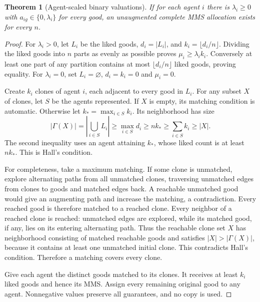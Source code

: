 \documentclass[11pt,a4paper]{article}
\newtheorem{theorem}{Theorem}[section]
\theoremstyle{remark}\newtheorem{remark}[theorem]{Remark}
\begin{document}
\begin{theorem}[Agent-scaled binary valuations]\label{thm:binaryMMS}
If for each agent $i$ there is $\lambda_i\ge0$ with $a_{ig}\in\{0,\lambda_i\}$ for every good, an unaugmented complete MMS allocation exists for every $n$.
\end{theorem}
\begin{proof}
For $\lambda_i>0$, let $L_i$ be the liked goods, $d_i=|L_i|$, and $k_i=\lfloor d_i/n\rfloor$. Dividing the liked goods into $n$ parts as evenly as possible proves $\mu_i\ge\lambda_i k_i$. Conversely at least one part of any partition contains at most $\lfloor d_i/n\rfloor$ liked goods, proving equality. For $\lambda_i=0$, set $L_i=\varnothing$, $d_i=k_i=0$ and $\mu_i=0$.

Create $k_i$ clones of agent $i$, each adjacent to every good in $L_i$. For any subset $X$ of clones, let $S$ be the agents represented. If $X$ is empty, its matching condition is automatic. Otherwise let $k_* =\max_{i\in S}k_i$. Its neighborhood has size
\[
|\Gamma(X)|=\left|\bigcup_{i\in S}L_i\right|\ge\max_{i\in S}d_i
\ge nk_*\ge\sum_{i\in S}k_i\ge|X|.
\]
The second inequality uses an agent attaining $k_*$, whose liked count is at least $nk_*$. This is Hall's condition.

For completeness, take a maximum matching. If some clone is unmatched, explore alternating paths from all unmatched clones, traversing unmatched edges from clones to goods and matched edges back. A reachable unmatched good would give an augmenting path and increase the matching, a contradiction. Every reached good is therefore matched to a reached clone. Every neighbor of a reached clone is reached: unmatched edges are explored, while its matched good, if any, lies on its entering alternating path. Thus the reachable clone set $X$ has neighborhood consisting of matched reachable goods and satisfies $|X|>|\Gamma(X)|$, because it contains at least one unmatched initial clone. This contradicts Hall's condition. Therefore a matching covers every clone.

Give each agent the distinct goods matched to its clones. It receives at least $k_i$ liked goods and hence its MMS. Assign every remaining original good to any agent. Nonnegative values preserve all guarantees, and no copy is used.
\end{proof}
\end{document}
